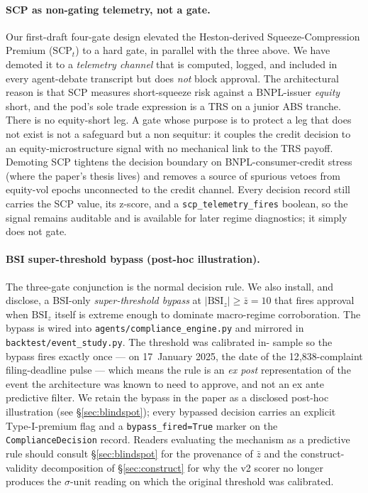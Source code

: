 \documentclass[11pt,letterpaper]{article}
\newcommand{\bsi}{\text{BSI}}
\newcommand{\scp}{\text{SCP}}
\begin{document}
\paragraph{SCP as non-gating telemetry, not a gate.}
Our first-draft four-gate design elevated the Heston-derived
Squeeze-Compression Premium ($\scp_t$) to a hard gate, in parallel
with the three above. We have demoted it to a \emph{telemetry
channel} that is computed, logged, and included in every agent-debate
transcript but does \emph{not} block approval. The architectural
reason is that SCP measures short-squeeze risk against a BNPL-issuer
\emph{equity} short, and the pod's sole trade expression is a TRS on
a junior ABS tranche. There is no equity-short leg. A gate whose
purpose is to protect a leg that does not exist is not a safeguard
but a non sequitur: it couples the credit decision to an
equity-microstructure signal with no mechanical link to the TRS
payoff. Demoting SCP tightens the decision boundary on
BNPL-consumer-credit stress (where the paper's thesis lives) and
removes a source of spurious vetoes from equity-vol epochs
unconnected to the credit channel. Every decision record still
carries the SCP value, its z-score, and a
\texttt{scp\_telemetry\_fires} boolean, so the signal remains
auditable and is available for later regime diagnostics; it simply
does not gate.

\paragraph{BSI super-threshold bypass (post-hoc illustration).}
The three-gate conjunction is the normal decision rule. We also
install, and disclose, a BSI-only \emph{super-threshold bypass} at
$|\bsi_z| \geq \bar{z} = 10$ that fires approval when $\bsi_z$ itself
is extreme enough to dominate macro-regime corroboration. The bypass
is wired into \texttt{agents/compliance\_engine.py} and mirrored in
\texttt{backtest/event\_study.py}. The threshold was calibrated in-
sample so the bypass fires exactly once --- on 17~January 2025, the
date of the 12{,}838-complaint filing-deadline pulse --- which means
the rule is an \emph{ex post} representation of the event the
architecture was known to need to approve, and not an ex ante
predictive filter. We retain the bypass in the paper as a disclosed
post-hoc illustration (see \S\ref{sec:blindspot}); every bypassed
decision carries an explicit Type-I-premium flag and a
\texttt{bypass\_fired=True} marker on the \texttt{ComplianceDecision}
record. Readers evaluating the mechanism as a predictive rule should
consult \S\ref{sec:blindspot} for the provenance of $\bar{z}$ and the
construct-validity decomposition of \S\ref{sec:construct} for why the
v2 scorer no longer produces the $\sigma$-unit reading on which the
original threshold was calibrated.
\end{document}
